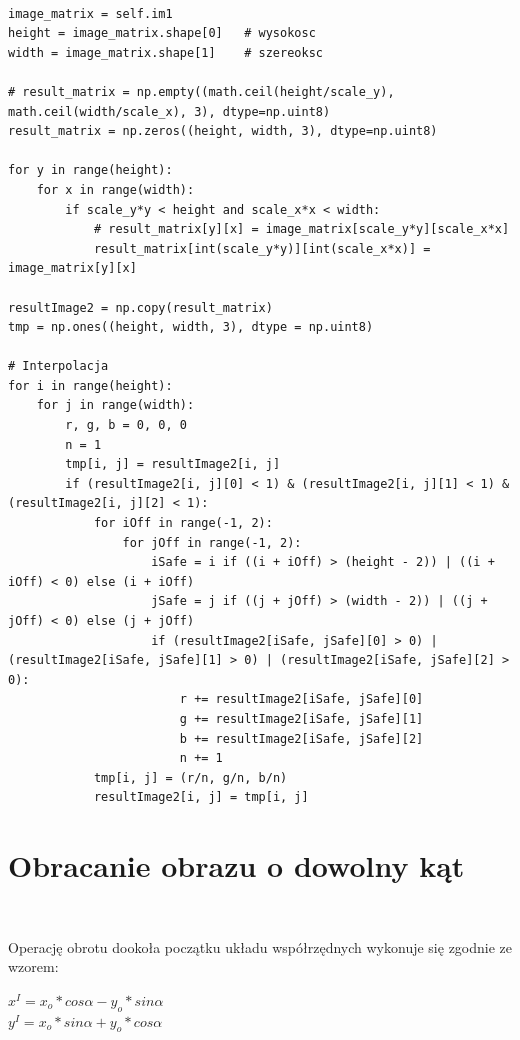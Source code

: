 \documentclass[final,a4paper,openany,12pt]{mwbk}
\begin{document}
\begin{lstlisting}[caption= Niejednorodne skalowanie obrazu]

image_matrix = self.im1
height = image_matrix.shape[0]   # wysokosc
width = image_matrix.shape[1]    # szereoksc

# result_matrix = np.empty((math.ceil(height/scale_y), math.ceil(width/scale_x), 3), dtype=np.uint8)
result_matrix = np.zeros((height, width, 3), dtype=np.uint8)

for y in range(height):
    for x in range(width): 
        if scale_y*y < height and scale_x*x < width:
            # result_matrix[y][x] = image_matrix[scale_y*y][scale_x*x]
            result_matrix[int(scale_y*y)][int(scale_x*x)] = image_matrix[y][x]

resultImage2 = np.copy(result_matrix)
tmp = np.ones((height, width, 3), dtype = np.uint8)

# Interpolacja
for i in range(height):
    for j in range(width):
        r, g, b = 0, 0, 0
        n = 1
        tmp[i, j] = resultImage2[i, j]
        if (resultImage2[i, j][0] < 1) & (resultImage2[i, j][1] < 1) & (resultImage2[i, j][2] < 1):
            for iOff in range(-1, 2):
                for jOff in range(-1, 2):
                    iSafe = i if ((i + iOff) > (height - 2)) | ((i + iOff) < 0) else (i + iOff)
                    jSafe = j if ((j + jOff) > (width - 2)) | ((j + jOff) < 0) else (j + jOff)
                    if (resultImage2[iSafe, jSafe][0] > 0) | (resultImage2[iSafe, jSafe][1] > 0) | (resultImage2[iSafe, jSafe][2] > 0):
                        r += resultImage2[iSafe, jSafe][0]
                        g += resultImage2[iSafe, jSafe][1]
                        b += resultImage2[iSafe, jSafe][2]
                        n += 1
            tmp[i, j] = (r/n, g/n, b/n)
            resultImage2[i, j] = tmp[i, j]

\end{lstlisting}
\newpage

\section{ Obracanie obrazu o dowolny kąt}
\hfill\\
\indent

Operację obrotu dookoła początku układu współrzędnych wykonuje się zgodnie ze wzorem:
	
	\begin{center}
		$x^I = x_{o} * cos\alpha - y_{o} * sin\alpha$\\
		$y^I = x_{o} * sin\alpha + y_{o} * cos\alpha$
	\end{center}
	
\end{document}
